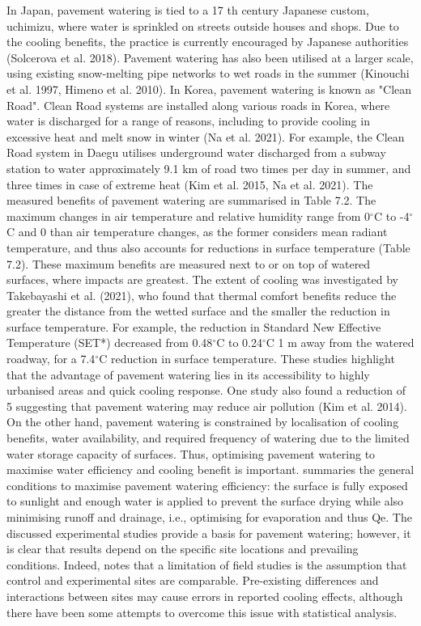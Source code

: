 \documentclass[final,3p,times,authoryear]{elsarticle}
\begin{document}
In Japan, pavement watering is tied to a 17 th century Japanese custom, uchimizu, where
water is sprinkled on streets outside houses and shops. Due to the cooling benefits, the
practice is currently encouraged by Japanese authorities (Solcerova et al. 2018).
Pavement watering has also been utilised at a larger scale, using existing snow-melting
pipe networks to wet roads in the summer (Kinouchi et al. 1997, Himeno et al. 2010).
In Korea, pavement watering is known as "Clean Road". Clean Road systems are
installed along various roads in Korea, where water is discharged for a range of reasons,
including to provide cooling in excessive heat and melt snow in winter (Na et al. 2021).
For example, the Clean Road system in Daegu utilises underground water discharged from a subway station to water approximately 9.1 km of road two times per day in
summer, and three times in case of extreme heat (Kim et al. 2015, Na et al. 2021).
The measured benefits of pavement watering are summarised in Table 7.2. The
maximum changes in air temperature and relative humidity range from 0$^{\circ}$C to -4$^{\circ}$C
and 0 %
than air temperature changes, as the former considers mean radiant temperature, and
thus also accounts for reductions in surface temperature (Table 7.2).
These maximum benefits are measured next to or on top of watered surfaces, where
impacts are greatest. The extent of cooling was investigated by Takebayashi et al.
(2021), who found that thermal comfort benefits reduce the greater the distance from the
wetted surface and the smaller the reduction in surface temperature. For example, the
reduction in Standard New Effective Temperature (SET*) decreased from 0.48$^{\circ}$C to
0.24$^{\circ}$C 1 m away from the watered roadway, for a 7.4$^{\circ}$C reduction in surface
temperature.
These studies highlight that the advantage of pavement watering lies in its accessibility
to highly urbanised areas and quick cooling response. One study also found a reduction
of 5 %
suggesting that pavement watering may reduce air pollution (Kim et al. 2014). On the
other hand, pavement watering is constrained by localisation of cooling benefits, water availability, and required frequency of watering due to the limited water storage
capacity of surfaces. Thus, optimising pavement watering to maximise water efficiency
and cooling benefit is important.
\cite{Hendel2020} summaries the general conditions to maximise pavement watering
efficiency: the surface is fully exposed to sunlight and enough water is applied to
prevent the surface drying while also minimising runoff and drainage, i.e., optimising
for evaporation and thus \gls{Qe}.
The discussed experimental studies provide a basis for pavement watering; however, it
is clear that results depend on the specific site locations and prevailing conditions.
Indeed, \cite{Hendel2016} notes that a limitation of field studies is the assumption that
control and experimental sites are comparable. Pre-existing differences and interactions
between sites may cause errors in reported cooling effects, although there have been
some attempts to overcome this issue with statistical analysis.
\end{document}
